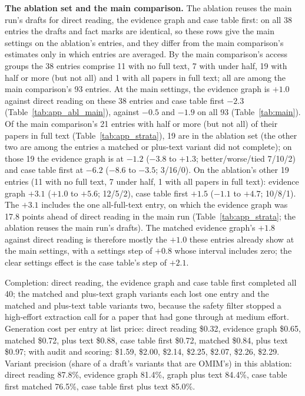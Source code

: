 \documentclass{article} %
\begin{document}
\textbf{The ablation set and the main comparison.} The ablation reuses the main run's drafts for direct reading, the evidence graph and case table first: on all 38 entries the drafts and fact marks are identical, so these rows give the main settings on the ablation's entries, and they differ from the main comparison's estimates only in which entries are averaged. By the main comparison's access groups the 38 entries comprise 11 with no full text, 7 with under half, 19 with half or more (but not all) and 1 with all papers in full text; all are among the main comparison's 93 entries. At the main settings, the evidence graph is $+1.0$ against direct reading on these 38 entries and case table first $-2.3$ (Table~\ref{tab:app_abl_main}), against $-0.5$ and $-1.9$ on all 93 (Table~\ref{tab:main}). Of the main comparison's 21 entries with half or more (but not all) of their papers in full text (Table~\ref{tab:app_strata}), 19 are in the ablation set (the other two are among the entries a matched or plus-text variant did not complete); on those 19 the evidence graph is at $-1.2$ ($-3.8$ to $+1.3$; better/worse/tied 7/10/2) and case table first at $-6.2$ ($-8.6$ to $-3.5$; 3/16/0). On the ablation's other 19 entries (11 with no full text, 7 under half, 1 with all papers in full text): evidence graph $+3.1$ ($+1.0$ to $+5.6$; 12/5/2), case table first $+1.5$ ($-1.1$ to $+4.7$; 10/8/1). The $+3.1$ includes the one all-full-text entry, on which the evidence graph was 17.8 points ahead of direct reading in the main run (Table~\ref{tab:app_strata}; the ablation reuses the main run's drafts). The matched evidence graph's $+1.8$ against direct reading is therefore mostly the $+1.0$ these entries already show at the main settings, with a settings step of $+0.8$ whose interval includes zero; the clear settings effect is the case table's step of $+2.1$.

Completion: direct reading, the evidence graph and case table first completed all 40; the matched and plus-text graph variants each lost one entry and the matched and plus-text table variants two, because the safety filter stopped a high-effort extraction call for a paper that had gone through at medium effort. Generation cost per entry at list price: direct reading \$0.32, evidence graph \$0.65, matched \$0.72, plus text \$0.88, case table first \$0.72, matched \$0.84, plus text \$0.97; with audit and scoring: \$1.59, \$2.00, \$2.14, \$2.25, \$2.07, \$2.26, \$2.29. Variant precision (share of a draft's variants that are OMIM's) in this ablation: direct reading 87.8\%, evidence graph 81.4\%, graph plus text 84.4\%, case table first matched 76.5\%, case table first plus text 85.0\%.
\end{document}
